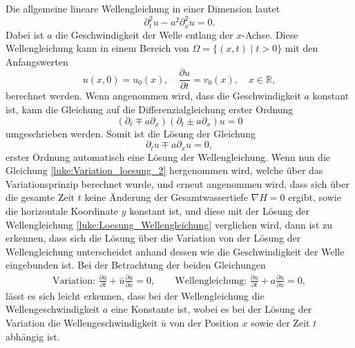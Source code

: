 Die allgemeine lineare Wellengleichung in einer Dimension lautet
%
%
\[
\partial_t^2 u - a^2 \partial_x^2 u  = 0.
\]
Dabei ist $a$ die Geschwindigkeit der Welle entlang der $x$-Achse.
Diese Wellengleichung kann in einem Bereich von $\Omega = \{(x,t)\mid t >0\}$ mit den Anfangswerten
\[
u(x,0) = u_0(x),\quad \frac{\partial u}{\partial t} = v_0(x),\quad x \in \mathbb{R},
\]
berechnet werden.
Wenn angenommen wird, dass die Geschwindigkeit $a$ konstant ist, kann die Gleichung auf die Differenzialgleichung erster Ordnung
\[
(\partial_t\mp a\partial_x)(\partial_t\pm a\partial_x) u  = 0
\]
 umgeschrieben werden.
Somit ist die Lösung der Gleichung
\begin{equation}
	\partial_t u \mp a\partial_x u = 0,
	\label{luke:Loesung_Wellengleichung}
\end{equation}
erster Ordnung automatisch eine Lösung der Wellengleichung.
Wenn nun die Gleichung \eqref{luke:Variation_loesung_2} hergenommen wird, welche über das Variationsprinzip berechnet wurde, und erneut angenommen wird, dass sich über die gesamte Zeit $t$ keine Änderung der Gesamtwassertiefe $ \nabla H = 0 $ ergibt, sowie die horizontale Koordinate $y$ konstant ist, und diese mit der Lösung der Wellengleichung \eqref{luke:Loesung_Wellengleichung} verglichen wird, dann ist zu erkennen, dass sich die Lösung über die Variation von der Lösung der Wellengleichung unterscheidet anhand dessen wie die Geschwindigkeit der Welle eingebunden ist.
Bei der Betrachtung der beiden Gleichungen
\begin{align}
	\text{Variation: }\frac{\partial \bar{u}}{\partial t} + \bar{u} \frac{\partial \bar{u}}{\partial x} = 0,
	\qquad
	\text{Wellengleichung: }\frac{\partial u}{\partial t} + a \frac{\partial u}{\partial x} = 0,
	\nonumber
\end{align}
lässt es sich leicht erkennen, dass bei der Wellengleichung die Wellengeschwindigkeit $a$ eine Konstante ist, wobei es bei der Lösung der Variation die Wellengeschwindigkeit $\bar{u}$ von der Position $x$ sowie der Zeit $t$ abhängig ist.

